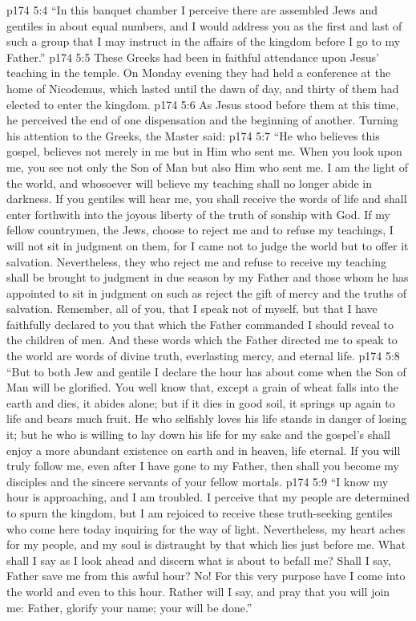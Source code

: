 \vs p174 5:4 \textcolor{ubdarkred}{“In this banquet chamber I perceive there are assembled Jews and gentiles in about equal numbers, and I would address you as the first and last of such a group that I may instruct in the affairs of the kingdom before I go to my Father.”}
\vs p174 5:5 These Greeks had been in faithful attendance upon Jesus’ teaching in the temple. On Monday evening they had held a conference at the home of Nicodemus, which lasted until the dawn of day, and thirty of them had elected to enter the kingdom.
\vs p174 5:6 As Jesus stood before them at this time, he perceived the end of one dispensation and the beginning of another. Turning his attention to the Greeks, the Master said:
\vs p174 5:7 \pc \textcolor{ubdarkred}{“He who believes this gospel, believes not merely in me but in Him who sent me. When you look upon me, you see not only the Son of Man but also Him who sent me. I am the light of the world, and whosoever will believe my teaching shall no longer abide in darkness. If you gentiles will hear me, you shall receive the words of life and shall enter forthwith into the joyous liberty of the truth of sonship with God. If my fellow countrymen, the Jews, choose to reject me and to refuse my teachings, I will not sit in judgment on them, for I came not to judge the world but to offer it salvation. Nevertheless, they who reject me and refuse to receive my teaching shall be brought to judgment in due season by my Father and those whom he has appointed to sit in judgment on such as reject the gift of mercy and the truths of salvation. Remember, all of you, that I speak not of myself, but that I have faithfully declared to you that which the Father commanded I should reveal to the children of men. And these words which the Father directed me to speak to the world are words of divine truth, everlasting mercy, and eternal life.}
\vs p174 5:8 \textcolor{ubdarkred}{“But to both Jew and gentile I declare the hour has about come when the Son of Man will be glorified. You well know that, except a grain of wheat falls into the earth and dies, it abides alone; but if it dies in good soil, it springs up again to life and bears much fruit. He who selfishly loves his life stands in danger of losing it; but he who is willing to lay down his life for my sake and the gospel’s shall enjoy a more abundant existence on earth and in heaven, life eternal. If you will truly follow me, even after I have gone to my Father, then shall you become my disciples and the sincere servants of your fellow mortals.}
\vs p174 5:9 \textcolor{ubdarkred}{“I know my hour is approaching, and I am troubled. I perceive that my people are determined to spurn the kingdom, but I am rejoiced to receive these truth\hyp{}seeking gentiles who come here today inquiring for the way of light. Nevertheless, my heart aches for my people, and my soul is distraught by that which lies just before me. What shall I say as I look ahead and discern what is about to befall me? Shall I say, Father save me from this awful hour? No! For this very purpose have I come into the world and even to this hour. Rather will I say, and pray that you will join me: Father, glorify your name; your will be done.”}
